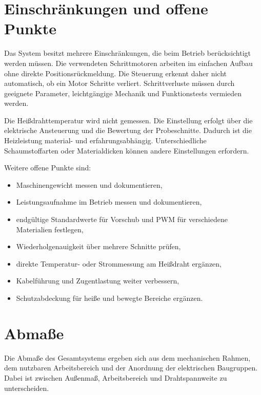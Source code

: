 \section{Einschränkungen und offene Punkte}
\label{sec:komplettes_system_einschraenkungen_todos}

Das System besitzt mehrere Einschränkungen, die beim Betrieb berücksichtigt werden müssen. Die verwendeten Schrittmotoren arbeiten im einfachen Aufbau ohne direkte Positionsrückmeldung. Die Steuerung erkennt daher nicht automatisch, ob ein Motor Schritte verliert. Schrittverluste müssen durch geeignete Parameter, leichtgängige Mechanik und Funktionstests vermieden werden.

Die Heißdrahttemperatur wird nicht gemessen. Die Einstellung erfolgt über die elektrische Ansteuerung und die Bewertung der Probeschnitte. Dadurch ist die Heizleistung material- und erfahrungsabhängig. Unterschiedliche Schaumstoffarten oder Materialdicken können andere Einstellungen erfordern.

Weitere offene Punkte sind:

\begin{itemize}
	\item Maschinengewicht messen und dokumentieren,
	\item Leistungsaufnahme im Betrieb messen und dokumentieren,
	\item endgültige Standardwerte für Vorschub und PWM für verschiedene Materialien festlegen,
	\item Wiederholgenauigkeit über mehrere Schnitte prüfen,
	\item direkte Temperatur- oder Strommessung am Heißdraht ergänzen,
	\item Kabelführung und Zugentlastung weiter verbessern,
	\item Schutzabdeckung für heiße und bewegte Bereiche ergänzen.
\end{itemize}

\section{Abmaße}
\label{sec:komplettes_system_abmasse}

Die Abmaße des Gesamtsystems ergeben sich aus dem mechanischen Rahmen, dem nutzbaren Arbeitsbereich und der Anordnung der elektrischen Baugruppen. Dabei ist zwischen Außenmaß, Arbeitsbereich und Drahtspannweite zu unterscheiden.

